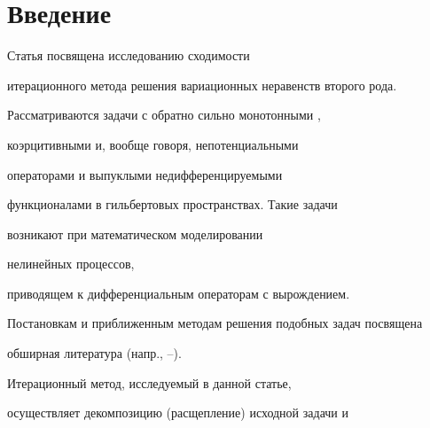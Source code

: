 \date{}




\pagestyle{plain} %







\maketitle


\label{begin}

















\section{Введение}





Статья посвящена исследованию сходимости 


итерационного метода решения вариационных неравенств второго рода.


Рассматриваются задачи с обратно сильно монотонными \cite{GT_89}, 


коэрцитивными и, вообще говоря, непотенциальными


операторами и выпуклыми недифференцируемыми 


функционалами в гильбертовых пространствах. Такие задачи 


возникают при математическом моделировании 


нелинейных процессов, 


приводящем к дифференциальным операторам с вырождением. 


Постановкам и приближенным методам решения подобных задач посвящена 


обширная литература (напр., \cite{D_Lio_80}--\cite{GLЕ_79}). 





Итерационный метод, исследуемый в данной статье,


осуществляет декомпозицию (расщепление) исходной задачи и


